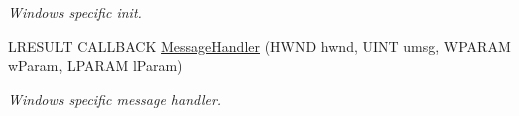 \begin{DoxyCompactItemize}
\begin{DoxyCompactList}\small\item\em Windows specific init. \end{DoxyCompactList}\item 
L\+R\+E\+S\+U\+LT C\+A\+L\+L\+B\+A\+CK \hyperlink{class_ensum_1_1_input_1_1_input_aae4be7b638bbfbb75afd3bb8d782cbae}{Message\+Handler} (H\+W\+ND hwnd, U\+I\+NT umsg, W\+P\+A\+R\+AM w\+Param, L\+P\+A\+R\+AM l\+Param)\hypertarget{class_ensum_1_1_input_1_1_input_aae4be7b638bbfbb75afd3bb8d782cbae}{}\label{class_ensum_1_1_input_1_1_input_aae4be7b638bbfbb75afd3bb8d782cbae}

\begin{DoxyCompactList}\small\item\em Windows specific message handler. \end{DoxyCompactList}\end{DoxyCompactItemize}
